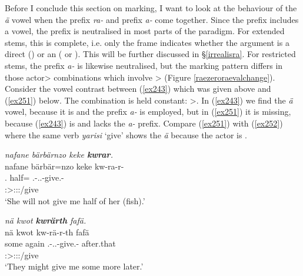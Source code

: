 Before I conclude this section on  marking, I want to look at the behaviour of the \emph{ä} vowel when the  prefix \emph{ra-} and  prefix \emph{a-} come together. Since the  prefix includes a vowel, the  prefix is neutralised in most parts of the paradigm. For extended stems, this  is complete, i.e. only the  frame indicates whether the  argument is a direct  (\Abs{}) or an  (\Dat{} or \Poss{}). This will be further discussed in \S{}\ref{irrealisra}. For restricted stems, the  prefix \emph{a-} is likewise neutralised, but the  marking pattern differs in those actor> combinations which involve \Sg>\Sg{} (Figure \ref{raezeroraevalchange}). Consider the vowel contrast between (\ref{ex243}) which was given above and (\ref{ex251}) below. The  combination is held constant: \Tsg>\Fsg{}. In (\ref{ex243}) we find the \emph{ä} vowel, because it is  and the  prefix \emph{a-} is employed, but in (\ref{ex251}) it is missing, because (\ref{ex243}) is  and lacks the \emph{a-} prefix. Compare (\ref{ex251}) with (\ref{ex252}) where the same verb \emph{yarisi} `give' shows the \emph{ä} because the actor  is .

\begin{exe}
	\ex \emph{nafane bärbärnzo keke \textbf{kwrar}.}\\
	\glll nafane {bärbär=nzo} keke kw-ra-r-\Zero\\
	\Tsg.\Poss{} {half=\Only} \Neg{} \Fsg.\Bet{}-\Irr.\Ndu.\Vc-give.\Rs-\Stsg\\
	{} {} {} \footnotesize{\Stsg:\Sbj>\Fsg:\Io:\Irr:\Pfv/give}\\
	\trans `She will not give me half of her (fish).'
	\label{ex251}
\end{exe}
\begin{exe}
	\ex \emph{nä kwot \textbf{kwrärth} fafä.}\\
	\glll nä kwot kw-rä-r-th fafä\\
	some again \Fsg.\Bet-\Irr.\Pl.\Vc-give.\Rs-\Stnsg{} after.that\\
	{} {} \footnotesize{\Stpl:\Sbj>\Fsg:\Io:\Irr:\Pfv/give} {}\\
	\trans `They might give me some more later.'
	\label{ex252}
\end{exe}

